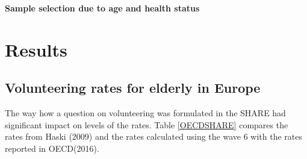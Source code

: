 \documentclass[10pt, letterpaper]{article}
\begin{document}
\begin{spacing}{1.4}
\textbf{Sample selection due to age and health status }\\

\section{Results}

\subsection*{Volunteering rates for elderly in Europe}

The way how a question on volunteering was formulated in the SHARE had
significant impact on levels of the rates. Table \ref{OECDSHARE}  compares the rates from Haski (2009) and the rates calculated using the wave 6 with the rates reported in OECD(2016).


\begin{spacing}{.9}
	 
      \label{OECDSHARE} 
\end{spacing}


\end{spacing}
\end{document}
